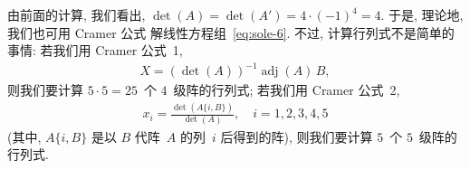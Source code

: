 \documentclass[../libro.tex]{subfiles}
\begin{document}
\begin{example}
    由前面的计算,
    我们看出,
    \(\det {(A)} = \det {(A')}
    = 4 \cdot (-1)^4 = 4\).
    于是, 理论地, 我们也可用 Cramer 公式%
    解线性方程组~\eqref{eq:sole-6}.
    不过, 计算行列式不是简单的事情:
    若我们用 Cramer 公式~1,
    \begin{align*}
        X = (\det {(A)})^{-1} \operatorname{adj} {(A)}\, B,
    \end{align*}
    则我们要计算 \(5 \cdot 5 = 25\)~个 \(4\)~级阵的行列式;
    若我们用 Cramer 公式~2,
    \begin{align*}
        x_i = \frac{\det {(A \{i, B\})}}{\det {(A)}},
        \quad
        i = 1, 2, 3, 4, 5
    \end{align*}
    (其中, \(A \{i, B\}\) 是以
    \(B\) 代阵~\(A\) 的列~\(i\) 后得到的阵),
    则我们要计算 \(5\)~个 \(5\)~级阵的行列式.
\end{example}
\end{document}
